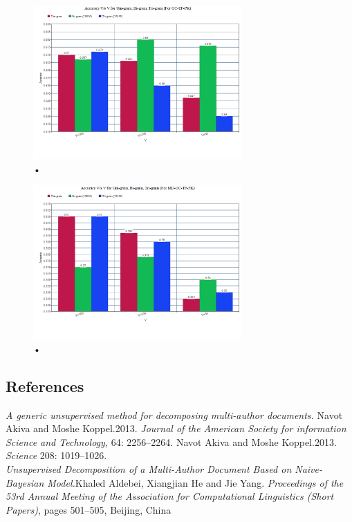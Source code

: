 \documentclass[letterpaper]{article}
\begin{document}
\begin{figure}
\caption{•}
\includegraphics[width=8cm]{5.png}
\end{figure}
\begin{figure}
\caption{•}
\includegraphics[width=8cm]{6.png}
\end{figure}

\subsection{References} 
\textit{A generic unsupervised method for decomposing multi-author documents.} Navot Akiva and Moshe Koppel.2013. \textit{Journal of the American Society for information Science and Technology,} 64: 2256--2264.
Navot Akiva and Moshe Koppel.2013. \textit{Science} 208: 1019--1026.\\
\textit{Unsupervised Decomposition of a Multi-Author Document Based on Naive-Bayesian Model.}Khaled Aldebei, Xiangjian He and Jie Yang. \textit{Proceedings of the 53rd Annual Meeting of the Association for Computational Linguistics (Short Papers)}, pages 501–505, Beijing, China
\end{document}
